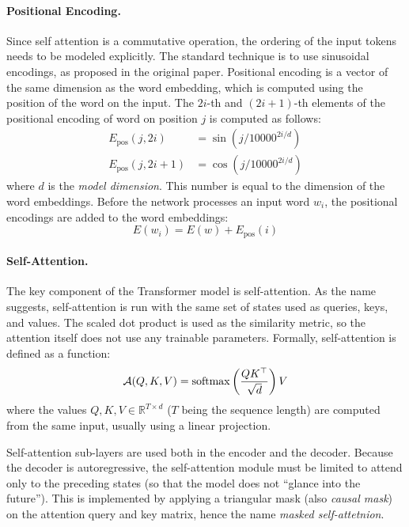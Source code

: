\paragraph{Positional Encoding.} Since self attention is a commutative
operation, the ordering of the input tokens needs to be modeled explicitly.
The standard technique is to use sinusoidal encodings, as proposed in the
original paper. Positional encoding is a vector of the same dimension as the
word embedding, which is computed using the position of the word on the input.
The $2i$-th and $(2i+1)$-th elements of the positional encoding of word on
position $j$ is computed as follows:
%
\begin{equation}
  \begin{split}
    E_{\text{pos}}(j, 2i) &= \sin(j / 10000^{2i/d}) \\
    E_{\text{pos}}(j, 2i + 1) &= \cos(j / 10000^{2i/d})
  \end{split} \label{eq:positional-encoding}
\end{equation}
%
where $d$ is the \emph{model dimension}. This number is equal to the dimension
of the word embeddings. Before the network processes an input word $w_i$, the
positional encodings are added to the word embeddings:
\begin{equation}
  E(w_i) = E(w) + E_{\text{pos}}(i)
\end{equation}

\paragraph{Self-Attention.} The key component of the Transformer model is
self-attention. As the name suggests, self-attention is run with the same set
of states used as queries, keys, and values. The scaled dot product is used as
the similarity metric, so the attention itself does not use any trainable
parameters. Formally, self-attention is defined as a function:
%
\begin{equation}
  \mathcal{A}(Q,K,V) = \operatorname*{softmax} \left( \frac{QK^\top}{\sqrt{d}} \right) V
  \label{eq:scaled-dot-product}
\end{equation}
%
where the values $Q, K, V \in \mathbb{R}^{T \times d}$ ($T$ being the sequence
length) are computed from the same input, usually using a linear projection.

Self-attention sub-layers are used both in the encoder and the decoder. Because
the decoder is autoregressive, the self-attention module must be limited to
attend only to the preceding states (so that the model does not ``glance into
the future''). This is implemented by applying a triangular mask (also
\emph{causal mask}) on the attention query and key matrix, hence the name
\emph{masked self-attetnion}.

